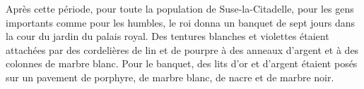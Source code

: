 Après cette période, pour toute la population de Suse-la-Citadelle,
	pour les gens importants comme pour les humbles,
	le roi donna un banquet de sept jours dans la cour du jardin du palais royal.
Des tentures blanches et violettes étaient attachées
		par des cordelières de lin et de pourpre
		à des anneaux d’argent et à des colonnes de marbre blanc.
Pour le banquet, des lits d’or et d’argent étaient posés
	sur un pavement de porphyre, de marbre blanc, de nacre et de marbre noir.
